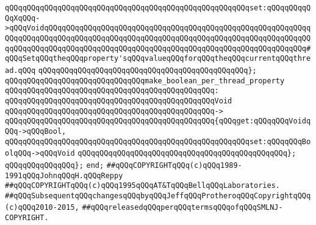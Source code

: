 \newline
\verb|qQQqqQQqqQQqqQQqqQQqqQQqqQQqqQQqqQQqqQQqqQQqqQQqqQQqqQQqset:qQQqqQQqqQQqXqQQq->qQQqVoidqQQqqQQqqQQqqQQqqQQqqQQqqQQqqQQqqQQqqQQqqQQqqQQqqQQqqQQqqQQqqQQqqQQqqQQqqQQqqQQqqQQqqQQqqQQqqQQqqQQqqQQqqQQqqQQqqQQqqQQqqQQqqQQqqQQqqQQqqQQqqQQqqQQqqQQqqQQqqQQqqQQqqQQqqQQqqQQqqQQqqQQqqQQqqQQqqQQqqQQq#qQQqSetqQQqtheqQQqproperty'sqQQqvalueqQQqforqQQqtheqQQqcurrentqQQqthread.qQQq|\newline
\verb|qQQqqQQqqQQqqQQqqQQqqQQqqQQqqQQqqQQqqQQqqQQqqQQq};|\newline
\newline
\verb|qQQqqQQqqQQqqQQqqQQqqQQqqQQqqQQqmake_boolean_per_thread_property|\newline
\verb|qQQqqQQqqQQqqQQqqQQqqQQqqQQqqQQqqQQqqQQqqQQqqQQq:|\newline
\verb|qQQqqQQqqQQqqQQqqQQqqQQqqQQqqQQqqQQqqQQqqQQqqQQqVoid|\newline
\verb|qQQqqQQqqQQqqQQqqQQqqQQqqQQqqQQqqQQqqQQqqQQqqQQq->|\newline
\verb|qQQqqQQqqQQqqQQqqQQqqQQqqQQqqQQqqQQqqQQqqQQqqQQq{qQQqget:qQQqqQQqVoidqQQq->qQQqBool,|\newline
\verb|qQQqqQQqqQQqqQQqqQQqqQQqqQQqqQQqqQQqqQQqqQQqqQQqqQQqqQQqset:qQQqqQQqBoolqQQq->qQQqVoid|\newline
\verb|qQQqqQQqqQQqqQQqqQQqqQQqqQQqqQQqqQQqqQQqqQQqqQQq};|\newline
\newline
\verb|qQQqqQQqqQQqqQQq};|\newline
\verb|end;|\newline
\newline
\newline
\verb|##qQQqCOPYRIGHTqQQq(c)qQQq1989-1991qQQqJohnqQQqH.qQQqReppy|\newline
\verb|##qQQqCOPYRIGHTqQQq(c)qQQq1995qQQqAT&TqQQqBellqQQqLaboratories.|\newline
\verb|##qQQqSubsequentqQQqchangesqQQqbyqQQqJeffqQQqProtheroqQQqCopyrightqQQq(c)qQQq2010-2015,|\newline
\verb|##qQQqreleasedqQQqperqQQqtermsqQQqofqQQqSMLNJ-COPYRIGHT.|\newline

